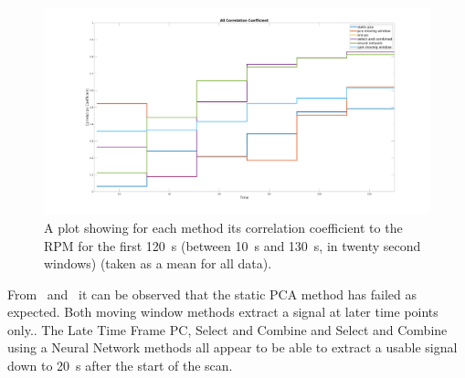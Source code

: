     \begin{figure}
        \centering
        
        \includegraphics[width=1.0\linewidth]{figures/all_correlation_coefficient_stairs.png}
        
        
        \captionsetup{singlelinecheck=false, justification=centering}
        \caption{
        \scriptsize
        A plot showing for each method its correlation coefficient to the \gls{RPM} for the first \SI{120}{\second} (between \SI{10}{\second} and \SI{130}{\second}, in twenty second windows) (taken as a mean for all data).}
        
        \label{fig:all_cross_correlation}
    \end{figure}
    
    
        
    
    
     From~ and~ it can be observed that the static \gls{PCA} method has failed as expected. Both moving window methods extract a signal at later time points only.. The Late Time Frame \gls{PC}, Select and Combine and Select and Combine using a Neural Network methods all appear to be able to extract a usable signal down to \SI{20}{\second} after the start of the scan.
    
